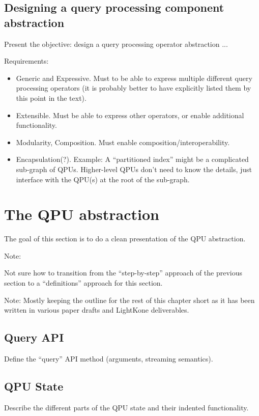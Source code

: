 \subsection{Designing a query processing component abstraction}
Present the objective: design a query processing operator abstraction ...

Requirements:
\begin{itemize}
  \item Generic and Expressive. Must to be able to express multiple different
  query processing operators (it is probably better to have explicitly listed
  them by this point in the text).
  \item Extensible. Must be able to express other operators, or enable
  additional functionality.
  \item Modularity, Composition. Must enable composition/interoperability.
  \item Encapsulation(?). Example: A ``partitioned index'' might be a
  complicated sub-graph of QPUs.
  Higher-level QPUs don't need to know the details, just interface with the
  QPU(s) at the root of the sub-graph.
\end{itemize}

\section{The QPU abstraction}
The goal of this section is to do a clean presentation of the QPU abstraction.

\begin{tcolorbox}
Note:

Not sure how to transition from the ``step-by-step'' approach of the
previous section to a ``definitions'' approach for this section.
\end{tcolorbox}

Note: Mostly keeping the outline for the rest of this chapter short as it has
been written in various paper drafts and LightKone deliverables.

\subsection{Query API}
Define the ``query'' API method (arguments, streaming semantics).

\subsection{QPU State}
Describe the different parts of the QPU state and their indented functionality.

